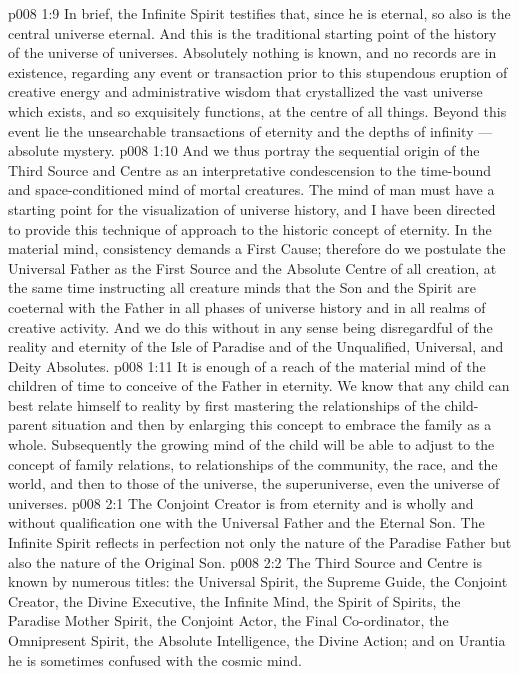 \vs p008 1:9 In brief, the Infinite Spirit testifies that, since he is eternal, so also is the central universe eternal. And this is the traditional starting point of the history of the universe of universes. Absolutely nothing is known, and no records are in existence, regarding any event or transaction prior to this stupendous eruption of creative energy and administrative wisdom that crystallized the vast universe which exists, and so exquisitely functions, at the centre of all things. Beyond this event lie the unsearchable transactions of eternity and the depths of infinity --- absolute mystery.
\vs p008 1:10 \pc And we thus portray the sequential origin of the Third Source and Centre as an interpretative condescension to the time\hyp{}bound and space\hyp{}conditioned mind of mortal creatures. The mind of man must have a starting point for the visualization of universe history, and I have been directed to provide this technique of approach to the historic concept of eternity. In the material mind, consistency demands a First Cause; therefore do we postulate the Universal Father as the First Source and the Absolute Centre of all creation, at the same time instructing all creature minds that the Son and the Spirit are coeternal with the Father in all phases of universe history and in all realms of creative activity. And we do this without in any sense being disregardful of the reality and eternity of the Isle of Paradise and of the Unqualified, Universal, and Deity Absolutes.
\vs p008 1:11 It is enough of a reach of the material mind of the children of time to conceive of the Father in eternity. We know that any child can best relate himself to reality by first mastering the relationships of the child\hyp{}parent situation and then by enlarging this concept to embrace the family as a whole. Subsequently the growing mind of the child will be able to adjust to the concept of family relations, to relationships of the community, the race, and the world, and then to those of the universe, the superuniverse, even the universe of universes.
\vs p008 2:1 The Conjoint Creator is from eternity and is wholly and without qualification one with the Universal Father and the Eternal Son. The Infinite Spirit reflects in perfection not only the nature of the Paradise Father but also the nature of the Original Son.
\vs p008 2:2 \pc The Third Source and Centre is known by numerous titles: the Universal Spirit, the Supreme Guide, the Conjoint Creator, the Divine Executive, the Infinite Mind, the Spirit of Spirits, the Paradise Mother Spirit, the Conjoint Actor, the Final Co\hyp{}ordinator, the Omnipresent Spirit, the Absolute Intelligence, the Divine Action; and on Urantia he is sometimes confused with the cosmic mind.
